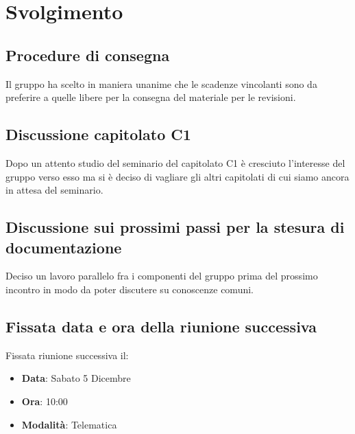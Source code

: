\documentclass[]{article}
\begin{document}
	\newpage
	
	\section{Svolgimento}
	\subsection{Procedure di consegna}
	Il gruppo ha scelto in maniera unanime che le scadenze vincolanti sono da preferire a quelle libere per la consegna del materiale per le revisioni.\\
	
	\subsection{Discussione capitolato C1}
	Dopo un attento studio del seminario del capitolato C1 è cresciuto l'interesse del gruppo verso esso ma si è deciso di vagliare gli altri capitolati di cui siamo ancora in attesa del seminario. 
	
	\subsection{Discussione sui prossimi passi per la stesura di documentazione}
	Deciso un lavoro parallelo fra i componenti del gruppo prima del
	prossimo incontro in modo da poter discutere su conoscenze comuni.\\
	
	\subsection{Fissata data e ora della riunione successiva}
	Fissata riunione successiva il:
	\begin{itemize}
		\item \textbf{Data}: Sabato 5 Dicembre
		\item \textbf{Ora}: 10:00
		\item \textbf{Modalità}: Telematica
	\end{itemize}
	
	
\end{document}
